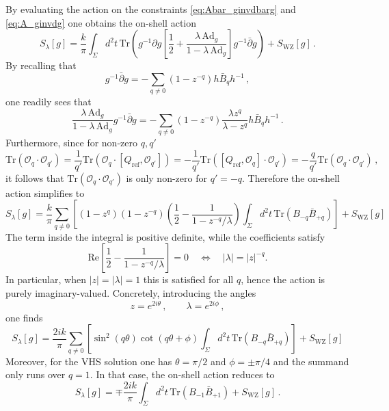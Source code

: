 \documentclass[11pt,a4paper]{article}
\numberwithin{equation}{section}
\numberwithin{table}{section}\setlength{\multlinegap}{25pt}
\begin{document}
By evaluating the action on the constraints \eqref{eq:Abar_ginvdbarg} and \eqref{eq:A_ginvdg} one obtains the on-shell action
\begin{equation}
	S_\lambda[g] =\frac{k}{\pi}\int_\Sigma d^2t\,\mathrm{Tr}\left(g^{-1}\partial g\left[\frac{1}{2}+\frac{\lambda\,\mathrm{Ad}_g}{1-\lambda \,\mathrm{Ad}_g} \right]g^{-1}\bar{\partial}g \right)+ S_{\mathrm{WZ}}[g]\,.
\end{equation}
By recalling that
\begin{equation}
	g^{-1}\bar{\partial}g = -\sum_{q\neq 0} (1-z^{-q})h \bar{B}_q h^{-1}\,,
\end{equation}
one readily sees that
\begin{equation}
	\frac{\lambda\,\mathrm{Ad}_g}{1-\lambda\, \mathrm{Ad}_g} g^{-1}\bar{\partial}g = -\sum_{q\neq 0}(1-z^{-q}) \frac{\lambda z^{q}}{\lambda-z^{q}}h \bar{B}_q h^{-1}\,.
\end{equation}
Furthermore, since for non-zero $q,q'$
\begin{equation}
	\mathrm{Tr}\left(\mathcal{O}_q\cdot\mathcal{O}_{q'}\right)=\frac{1}{q'}\mathrm{Tr}\left(\mathcal{O}_q\cdot[Q_{\mathrm{ref}},\mathcal{O}_{q'}]\right) = -\frac{1}{q'}\mathrm{Tr}\left([Q_{\mathrm{ref}},\mathcal{O}_q]\cdot\mathcal{O}_{q'}\right)=-\frac{q}{q'}\mathrm{Tr}\left(\mathcal{O}_q\cdot\mathcal{O}_{q'}\right)\,,
\end{equation}
it follows that $\mathrm{Tr}\left(\mathcal{O}_q\cdot\mathcal{O}_{q'}\right)$ is only non-zero for $q'=-q$. Therefore the on-shell action simplifies to
\begin{equation}
	S_\lambda[g] =\frac{k}{\pi}\sum_{q\neq 0}\left[(1-z^{q})(1-z^{-q})\left(\frac{1}{2}-\frac{1}{1-z^{-q}/\lambda}\right)\int_\Sigma d^2t\,\mathrm{Tr}\left(B_{-q}\bar{B}_{+q} \right)\right] +S_{\mathrm{WZ}}[g]
\end{equation}
The term inside the integral is positive definite, while the coefficients satisfy
\begin{equation}
	\mathrm{Re}\left[\frac{1}{2}-\frac{1}{1-z^{-q}/\lambda}\right] = 0 \quad \iff \quad |\lambda| = |z|^{-q}. 
\end{equation}
In particular, when $|z|=|\lambda|=1$ this is satisfied for all $q$, hence the action is purely imaginary-valued. Concretely, introducing the angles
\begin{equation}
	z = e^{2i\theta}\,,\qquad \lambda = e^{2i\phi}\,,
\end{equation} 
one finds
\begin{equation}
	S_\lambda[g] =\frac{2i k}{\pi}\sum_{q\neq 0}\left[\sin^2(q\theta)\cot(q\theta+\phi)\int_\Sigma d^2t\,\mathrm{Tr}\left(B_{-q}\bar{B}_{+q} \right)\right] +S_{\mathrm{WZ}}[g]
\end{equation}
Moreover, for the VHS solution one has $\theta=\pi/2$ and $\phi = \pm \pi/4$ and the summand only runs over $q=1$. In that case, the on-shell action reduces to
\begin{equation}
	S_\lambda[g] = \mp\frac{2i k}{\pi}\int_\Sigma d^2t\,\mathrm{Tr}\left(B_{-1}\bar{B}_{+1} \right) +S_{\mathrm{WZ}}[g]\,.
\end{equation}






\end{document}
